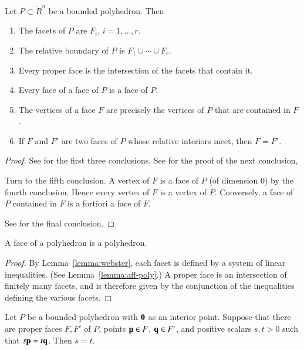 \begin{lemma}\label{lemma:webster}  
Let $P\subset\ring{R}^n$ be a bounded polyhedron.  Then
%
\begin{enumerate}
\item The facets of $P$ are $F_i$, $i=1,\ldots,r$.
\item The relative boundary of $P$ is $F_1\cup\cdots \cup F_r$.
\item Every proper face is the intersection of the facets that contain it.
\item Every face of a face of $P$ is a face of $P$.
\item The vertices of a face $F$ are precisely the vertices of $P$ that are contained in $F$.
\item If $F$ and $F'$ are two faces of $P$ whose relative interiors meet, then
$F=F'$.
\end{enumerate}
\end{lemma}
%
%
%

\begin{proof} See \cite[Thm~3.2.1]{webster:1994} for the first three conclusions.
See \cite[Th~2.6.5]{webster:1994} for the proof of the next conclusion,

Turn to the fifth conclusion.  A vertex of $F$ is a face of $P$ (of dimension $0$) by the fourth conclusion.  Hence every vertex of $F$ is a vertex of $P$.  Conversely, a face of $P$ contained in $F$ is a fortiori a face of $F$.

See \cite[Cor~2.6.7]{webster:1994} for the final conclusion.
\end{proof}

\begin{corollary}
A face of a polyhedron is a polyhedron.  
\end{corollary}

\begin{proof} By Lemma~\ref{lemma:webster}, each facet is defined by a system of linear inequalities.  (See Lemma~\ref{lemma:aff-poly}.)  A proper face is an intersection of finitely many facets, and is therefore given by the conjunction of the inequalities defining the various facets.
\end{proof}


\begin{lemma} \label{lemma:scale} 
Let $P$ be a bounded polyhedron with ${\mathbf 0}$ as an interior point.  Suppose that there are proper faces $F,F'$ of $P$, points ${\mathbf p}\in F$, ${\mathbf q}\in F'$, and positive scalars $s,t >0$ such that $s {\mathbf p} = t {\mathbf q}$.  Then $s=t$.
\end{lemma}

